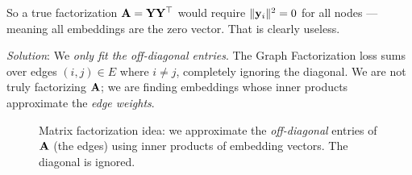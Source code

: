 \begin{notechapter}
\begin{pitfall}
So a true factorization $\mathbf{A} = \mathbf{Y}\mathbf{Y}^\top$ would require $\|\mathbf{y}_i\|^2 = 0$ for all nodes --- meaning all embeddings are the zero vector. That is clearly useless.

\emph{Solution}: We \emph{only fit the off-diagonal entries}. The Graph Factorization loss sums over edges $(i,j) \in E$ where $i \neq j$, completely ignoring the diagonal. We are not truly factorizing $\mathbf{A}$; we are finding embeddings whose inner products approximate the \emph{edge weights}.
\end{pitfall}

\begin{figure}[htbp]
\centering
{}
\caption{Matrix factorization idea: we approximate the \emph{off-diagonal} entries of $\mathbf{A}$ (the edges) using inner products of embedding vectors. The diagonal is ignored.}
\end{figure}


\end{notechapter}
